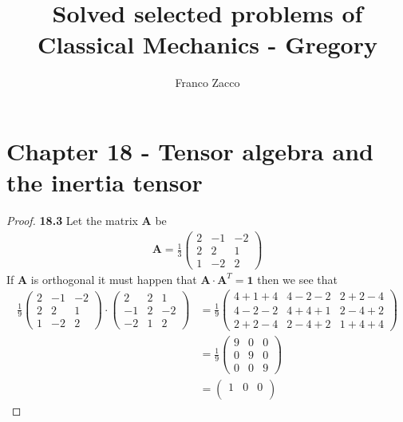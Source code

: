 \documentclass[11pt]{article}
\title{\textbf{Solved selected problems of Classical Mechanics - Gregory}}
\author{Franco Zacco}
\date{}
\theoremstyle{definition}
\begin{document}
\maketitle
\thispagestyle{empty}

\section*{Chapter 18 - Tensor algebra and the inertia tensor}

\begin{proof}{\textbf{18.3}}
    Let the matrix $\bm{A}$ be
    \begin{align*}
        \bm{A} = \frac{1}{3}\begin{pmatrix}
            2 & -1 & -2\\
            2 & 2  & 1\\
            1 & -2 & 2
        \end{pmatrix}
    \end{align*}
    If $\bm{A}$ is orthogonal it must happen that
    $\bm{A}\cdot \bm{A}^T = \bm{1}$ then we see that
    \begin{align*}
        \frac{1}{9}\begin{pmatrix}
            2 & -1 & -2\\
            2 & 2  & 1\\
            1 & -2 & 2
        \end{pmatrix} \cdot
        \begin{pmatrix}
            2 & 2 & 1\\
            -1 & 2  & -2\\
            -2 & 1 & 2
        \end{pmatrix}
        &= \frac{1}{9}\begin{pmatrix}
            4 + 1 + 4 & 4 - 2 - 2 & 2 + 2 - 4\\
            4 - 2 - 2 & 4 + 4 + 1 & 2 - 4 + 2\\
            2 + 2 - 4 & 2 - 4 + 2 & 1 + 4 + 4
        \end{pmatrix}\\
        &= \frac{1}{9}\begin{pmatrix}
            9 & 0 & 0\\
            0 & 9 & 0\\
            0 & 0 & 9
        \end{pmatrix}\\
        &= \begin{pmatrix}
            1 & 0 & 0\\

\end{pmatrix}
\end{align*}
\end{proof}
\end{document}
